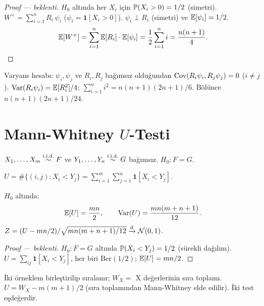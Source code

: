 \begin{proof}[Proof --- beklenti]
$H_0$ altında her $X_i$ için $\mathbb{P}(X_i>0)=1/2$ (simetri). $W^+=\sum_{i=1}^n R_i\,\psi_i$ ($\psi_i=\mathbf{1}[X_i>0]$). $\psi_i\perp R_i$ (simetri) ve $\mathbb{E}[\psi_i]=1/2$.
\[
  \mathbb{E}[W^+] = \sum_{i=1}^n\mathbb{E}[R_i]\cdot\mathbb{E}[\psi_i] = \frac{1}{2}\sum_{i=1}^n i = \frac{n(n+1)}{4}.
\]
\end{proof}

\begin{ispatiskele}
Varyans hesabı: $\psi_i,\psi_j$ ve $R_i,R_j$ bağımsız olduğundan $\operatorname{Cov}(R_i\psi_i,R_j\psi_j)=0$ ($i\neq j$). $\operatorname{Var}(R_i\psi_i)=\mathbb{E}[R_i^2]/4$; $\sum_{i=1}^n i^2=n(n+1)(2n+1)/6$. Bölünce $n(n+1)(2n+1)/24$.
\end{ispatiskele}

\section{Mann-Whitney $U$-Testi}
\label{sec:mann_whitney}

\begin{tanim}\label{def:mann_whitney}
$X_1,\ldots,X_m\overset{\text{i.i.d.}}{\sim} F$ ve $Y_1,\ldots,Y_n\overset{\text{i.i.d.}}{\sim} G$ bağımsız. $H_0:F=G$.

$U = \#\{(i,j): X_i < Y_j\} = \sum_{i=1}^m\sum_{j=1}^n\mathbf{1}[X_i<Y_j]$.
\end{tanim}

\begin{teorem}\label{thm:mann_whitney}
$H_0$ altında:
\[
  \mathbb{E}[U] = \frac{mn}{2}, \qquad \operatorname{Var}(U) = \frac{mn(m+n+1)}{12}.
\]
$Z = (U - mn/2)/\sqrt{mn(m+n+1)/12}\xrightarrow{d}\mathcal{N}(0,1)$.
\end{teorem}

\begin{proof}[Proof --- beklenti]
$H_0:F=G$ altında $\mathbb{P}(X_i<Y_j)=1/2$ (sürekli dağılım). $U=\sum_{ij}\mathbf{1}[X_i<Y_j]$, her biri $\mathrm{Ber}(1/2)$; $\mathbb{E}[U]=mn/2$.
\end{proof}

\begin{teorem}\label{thm:wilcoxon_mann}
İki örneklem birleştirilip sıralanır; $W_X = $ X değerlerinin sıra toplamı. $U = W_X - m(m+1)/2$ (sıra toplamından Mann-Whitney elde edilir). İki test eşdeğerdir.
\end{teorem}


